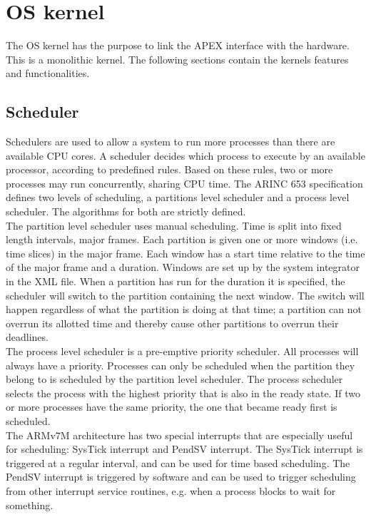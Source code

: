 \section{OS kernel}
The OS kernel has the purpose to link the APEX interface with the hardware.
This is a monolithic kernel. The following sections contain
the kernel\textquotesingle s features and functionalities.


\subsection{Scheduler}
\label{ssec:design_scheduling}
Schedulers are used to allow a system to run more processes than there are
available CPU cores.
A scheduler decides which process to execute by an available processor,
according to predefined rules. Based on these rules, two or
more processes may run concurrently, sharing CPU time. The ARINC 653
specification defines two levels of scheduling, a partitions level scheduler and a
process level scheduler. The algorithms for both are strictly defined.\\

The partition level scheduler uses manual scheduling. Time is split into fixed
length intervals, major frames. Each partition is given one or more windows
(i.e. time slices) in the major frame. Each window has a start time
relative to the time of the major frame and a duration. Windows are set up by
the system integrator in the XML file\cite{arinc_part_scheduling}.
When a partition has run for the duration it is specified, the scheduler will
switch to the partition containing the next window. The switch will happen regardless of
what the partition is doing at that time; a partition can not overrun its
allotted time and thereby cause other partitions to overrun their deadlines.\\

The process level scheduler is a pre-emptive priority scheduler. All processes
will always have a priority. Processes can only be scheduled when the
partition they belong to is scheduled by the partition level scheduler. The
process scheduler selects the process with the highest priority that is also
in the ready state. If two or more processes have the same priority, the one
that became ready first is scheduled\cite{arinc_pro_scheduling}.\\

The ARMv7M architecture has two special interrupts that are especially useful
for scheduling: SysTick interrupt and PendSV interrupt. The SysTick interrupt is
triggered at a regular interval, and can be used for time based scheduling. The
PendSV interrupt is triggered by software and can be used to trigger
scheduling from other interrupt service routines, e.g. when a process blocks to
wait for something.


